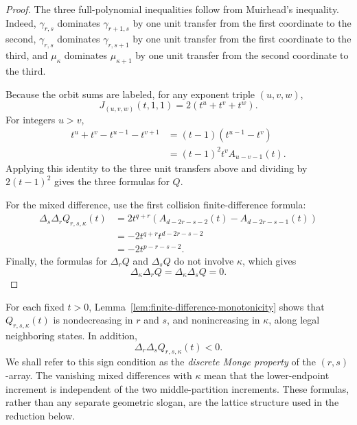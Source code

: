 \documentclass[10pt,a4paper]{amsart}
\begin{document}
\begin{proof}
The three full-polynomial inequalities follow from Muirhead's inequality.  Indeed,
\(\gamma_{r,s}\) dominates \(\gamma_{r+1,s}\) by one unit transfer from the first coordinate to the second,
\(\gamma_{r,s}\) dominates \(\gamma_{r,s+1}\) by one unit transfer from the first coordinate to the third, and
\(\mu_\kappa\) dominates \(\mu_{\kappa+1}\) by one unit transfer from the second coordinate to the third.

Because the orbit sums are labeled, for any exponent triple \((u,v,w)\),
\begin{equation*}
J_{(u,v,w)}(t,1,1)
=
2(t^u+t^v+t^w).
\end{equation*}
For integers \(u>v\),
\begin{align*}
t^u+t^v-t^{u-1}-t^{v+1}
&=(t-1)(t^{u-1}-t^v)\\
&=(t-1)^2t^vA_{u-v-1}(t).
\end{align*}
Applying this identity to the three unit transfers above and dividing by
\(2(t-1)^2\) gives the three formulas for \(Q\).

For the mixed difference, use the first collision finite-difference formula:
\begin{align*}
\Delta_s\Delta_rQ_{r,s,\kappa}(t)
&=
2t^{q+r}
\left(
A_{d-2r-s-2}(t)-A_{d-2r-s-1}(t)
\right)\\
&=
-2t^{q+r}t^{d-2r-s-2}\\
&=
-2t^{p-r-s-2}.
\end{align*}
Finally, the formulas for \(\Delta_rQ\) and \(\Delta_sQ\) do not involve \(\kappa\), which gives
\begin{equation*}
\Delta_\kappa\Delta_rQ
=
\Delta_\kappa\Delta_sQ
=0.
\end{equation*}
\end{proof}

For each fixed \(t>0\), Lemma~\ref{lem:finite-difference-monotonicity} shows that
\(Q_{r,s,\kappa}(t)\) is nondecreasing in \(r\) and \(s\), and nonincreasing in \(\kappa\), along legal neighboring states.  In addition,
\begin{equation*}
\Delta_r\Delta_sQ_{r,s,\kappa}(t)<0.
\end{equation*}
We shall refer to this sign condition as the \emph{discrete Monge property} of the \((r,s)\)-array.  The vanishing mixed differences with \(\kappa\) mean that the lower-endpoint increment is independent of the two middle-partition increments.  These formulas, rather than any separate geometric slogan, are the lattice structure used in the reduction below.
\end{document}
